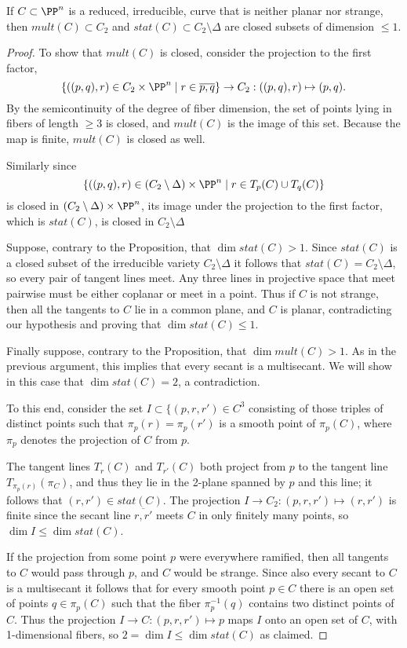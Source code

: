 \begin{proposition}\label{mult and stat}
 If $C\subset \PP^n$ is a reduced, irreducible, curve that is neither planar nor strange, then $mult(C)\subset C_2$
 and $stat(C)\subset C_2\setminus \Delta$ are closed subsets of dimension $\leq 1$.
\end{proposition}

\begin{proof}
To show that $mult(C)$ is closed, consider the projection to the first factor, 
$$
\{((p,q), r) \in C_2\times \PP^n \mid r \in \overline{p,q}\} \to C_2 : ((p,q),r)\mapsto (p,q).
$$
By the semicontinuity of the degree of fiber dimension, the set of points lying in fibers
of length $\geq 3$ is closed, and $mult(C)$ is the image of this set. Because the map is finite, 
$mult(C)$  is closed as well.

Similarly since 
$$
\{((p,q), r) \in (C_2\setminus \Delta)\times \PP^n \mid r \in T_p(C)\cup T_q(C) \}
$$
is closed in $(C_2\setminus \Delta)\times \PP^n$, its image under the projection to the first factor,
which is $stat(C)$, is closed in $C_2\setminus \Delta$

Suppose, contrary to the Proposition, that $\dim stat(C) >1$. Since $stat(C)$ is a closed subset of the irreducible variety $C_2\setminus \Delta$ it
follows that $stat(C) = C_2\setminus \Delta$, so every pair of tangent lines meet. Any three
lines in projective space that meet pairwise must be either coplanar or meet in a point. Thus if $C$ is not strange,
then all the tangents to $C$ lie in a common plane, and $C$ is planar, contradicting our hypothesis
and proving that $\dim stat(C)\leq 1$.

Finally suppose, contrary to the Proposition,  that $\dim mult(C)>1$. As in the previous argument, this
implies that every secant is a multisecant.  We will show in this case that $\dim stat(C) =2$, a contradiction. 

To this end, consider the set  $I \subset  \{(p,r,r')\in C^3$ consisting of those triples of distinct points 
such that $\pi_p(r) = \pi_p(r')$ is a smooth point of $\pi_p(C)$,
where $\pi_p$ denotes the projection of $C$ from $p$.

The tangent lines $T_r(C)$ and $T_{r'}(C)$ both project from $p$ to the tangent line $T_{\pi_p(r)}(\pi_C)$,
and thus they lie in the 2-plane spanned by $p$ and this line; it follows that $(r,r') \in stat(C)$.
The projection $I \to C_2: (p,r,r') \mapsto (r,r')$ is finite since the secant line $\overline{r,r'}$ meets $C$ in only finitely many points, 
so $\dim I \leq \dim stat(C)$.

 If the projection from some point $p$ were everywhere ramified,
then all tangents to $C$ would pass through $p$, and $C$ would be strange.
Since also every secant to $C$ is a multisecant it follows that  for every smooth point $p\in C$ there is an open set of points $q\in \pi_p(C)$ such that
the fiber $\pi_p^{-1}(q)$ contains two distinct points of $C$. Thus the projection $I \to C: (p,r,r') \mapsto p$ maps
$I$ onto an open set of $C$, with 1-dimensional fibers, so $2 = \dim I\leq \dim stat(C)$ as claimed. \end{proof}


